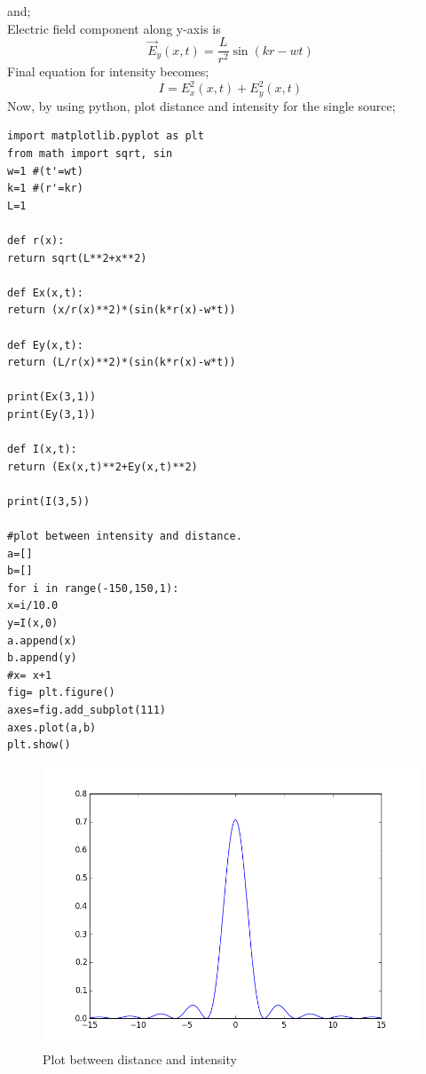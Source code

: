 and;\\
Electric field component along y-axis is\\
\begin{equation}
\vec{E}_y(x,t) = \frac{L}{r^2}\sin(kr-wt)
\end{equation}
Final equation for intensity becomes;\\
\begin{equation}
I = E_x^2(x,t)+E_y^2(x,t)
\end{equation}
Now, by using python, plot distance and intensity for the single source;\\
\begin{verbatim}
import matplotlib.pyplot as plt
from math import sqrt, sin
w=1 #(t'=wt)
k=1 #(r'=kr)
L=1

def r(x):
return sqrt(L**2+x**2)

def Ex(x,t):
return (x/r(x)**2)*(sin(k*r(x)-w*t))

def Ey(x,t):
return (L/r(x)**2)*(sin(k*r(x)-w*t))

print(Ex(3,1))
print(Ey(3,1))

def I(x,t):
return (Ex(x,t)**2+Ey(x,t)**2)

print(I(3,5))

#plot between intensity and distance.
a=[]
b=[]
for i in range(-150,150,1):
x=i/10.0
y=I(x,0)
a.append(x)
b.append(y)
#x= x+1
fig= plt.figure()
axes=fig.add_subplot(111)
axes.plot(a,b)
plt.show()
\end{verbatim}

\begin{figure}[ht]
\centering	
\includegraphics[scale=0.45]{figure_1.png}
\caption{Plot between distance and intensity}
\end{figure}

